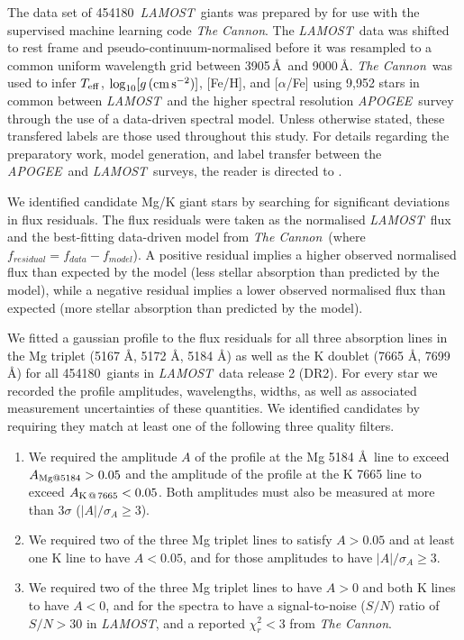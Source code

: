 \documentclass[a4paper,fleqn,usenatbib]{mnras}
\newcommand{\LamostGiants}{454180}
\newcommand{\project}[1]{\emph{#1}}
\newcommand{\lamost}{\project{LAMOST}}
\newcommand{\apogee}{\project{APOGEE}}
\newcommand{\tc}{\project{The Cannon}}
\newcommand{\teff}{T_{\rm eff}}
\newcommand{\logg}{\log_{10}[g\,({\rm cm\,s}^{-2})]}
\begin{document}
The data set of \LamostGiants\ \lamost\ giants was prepared by \citet{ho2017} for use with the supervised machine learning code \tc. The \lamost\ data was shifted to rest frame and pseudo-continuum-normalised before it was resampled to a common uniform wavelength grid between 3905\,\AA\ and 9000\,\AA. \tc\ was used to infer $\teff$, $\logg$, [Fe/H], and [$\alpha$/Fe] using 9,952 stars in common between \lamost\ and the higher spectral resolution \apogee\ survey through the use of a data-driven spectral model. Unless otherwise stated, these transfered labels are those used throughout this study. For details regarding the preparatory work, model generation, and label transfer between the \apogee\ and \lamost\ surveys, the reader is directed to \citet{ho2017}. 

We identified candidate Mg/K giant stars by searching for significant deviations in flux residuals. The flux residuals were taken as the normalised \lamost\ flux and the best-fitting data-driven model from \tc\ (where $f_{residual} = f_{data} - f_{model}$). A positive residual implies a higher observed normalised flux than expected by the model (less stellar absorption than predicted by the model), while a negative residual implies a lower observed normalised flux than expected (more stellar absorption than predicted by the model). 

We fitted a gaussian profile to the flux residuals for all three absorption lines in the Mg triplet (5167 \AA, 5172 \AA, 5184 \AA) as well as the K doublet (7665 \AA, 7699 \AA) for all \LamostGiants\ giants in \lamost\ data release 2 (DR2). For every star we recorded the profile amplitudes, wavelengths, widths, as well as associated measurement uncertainties of these quantities. We identified candidates by requiring they match at least one of the following three quality filters.
\begin{enumerate}
\item We required the amplitude $A$ of the profile at the Mg 5184 \AA \ line to exceed $A_{{\rm Mg} @ 5184} > 0.05$ and the amplitude of the profile at the K 7665 line to exceed $A_{{\rm K}\,@\,7665} < 0.05$. Both amplitudes must also be measured at more than $3\sigma$ ($|A|/\sigma_{A} \geq 3$).
\item We required two of the three Mg triplet lines to satisfy $A > 0.05$ and at least one K line to have $A < 0.05$, and for those amplitudes to have $|A|/\sigma_{A} \geq 3$.
\item We required two of the three Mg triplet lines to have $A > 0$ and both K lines to have $A < 0$, and for the spectra to have a signal-to-noise ($S/N$) ratio of $S/N > 30$ in \lamost, and a reported $\chi_{r}^2 < 3$ from \tc.
\end{enumerate} 
 
\end{document}

